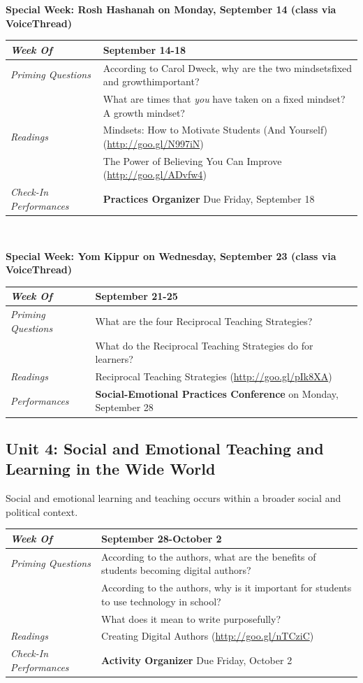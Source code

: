 \documentclass[two-side]{tufte-handout}
\newcommand{\gentopic}[1]{\begin{fullwidth}\begin{center}\faKey \textsf{#1}\end{center}\end{fullwidth}}
\newcommand{\tabpq}{\faQuestionCircle\medspace\textit{Priming Questions}}
\newcommand{\tabread}{\faBook\medspace\textit{Readings}}
\newcommand{\tabperformance}{\faTasks\medspace\textit{Performances}}
\newcommand{\tabdt}{\faCalendar\medspace\textit{Week Of}}
\newcommand{\tabcheckin}{\faCheckSquareO\medspace\textit{Check-In Performances}}
\newcommand{\tabbreak}{\begin{fullwidth}\begin{center}\faAsterisk\faAsterisk\faAsterisk\\\end{center}\end{fullwidth}}
\newcommand{\specialweek}[1]{\begin{fullwidth}\begin{center}\textbf{\faBullhorn\medspace Special Week: #1 \medspace\faBullhorn}\end{center}\end{fullwidth}}
\newenvironment{tabsched}
	{\small
	\begin{tabular}{p{1.5in}p{4.5in}}
	\midrule}
	{\midrule
	\end{tabular}
	\normalsize}
\newcommand{\weekfive}{September 14-18}
\newcommand{\weeksix}{September 21-25}
\newcommand{\weekseven}{September 28-October 2}
\newcommand{\roshhashanah}{Rosh Hashanah on Monday, September 14 (class via VoiceThread)}
\newcommand{\yomkippur}{Yom Kippur on Wednesday, September 23 (class via VoiceThread)}
\begin{document}
\specialweek{\roshhashanah}

\begin{tabsched}
	\tabdt & \weekfive \\
	\midrule
	\tabpq & According to Carol Dweck, why are the two mindsets\textemdash{}fixed and growth\textemdash{}important? \\
	& What are times that \emph{you} have taken on a fixed mindset? A growth mindset? \\
	\midrule
	\tabread & Mindsets: How to Motivate Students (And Yourself) (\url{http://goo.gl/N997iN}) \\
	& The Power of Believing You Can Improve (\url{http://goo.gl/ADvfw4}) \\
	\midrule
	\tabcheckin & \textbf{Practices Organizer} Due Friday, September 18 \\
\end{tabsched}

\tabbreak

\specialweek{\yomkippur}

\begin{tabsched}
	\tabdt & \weeksix \\
	\midrule
	\tabpq & What are the four Reciprocal Teaching Strategies? \\
	& What do the Reciprocal Teaching Strategies do for learners? \\
	\midrule
	\tabread & Reciprocal Teaching Strategies (\url{http://goo.gl/pIk8XA}) \\
	\midrule
	\tabperformance & \textbf{Social-Emotional Practices Conference} on Monday, September 28 \\
\end{tabsched}

\begin{fullwidth}
	\section{Unit 4: Social and Emotional Teaching and Learning in the Wide World}
\end{fullwidth}

\gentopic{Social and emotional learning and teaching occurs within a broader social and political context.}

\begin{tabsched}
	\tabdt & \weekseven \\
	\midrule
	\tabpq & According to the authors, what are the benefits of students becoming digital authors? \\
	& According to the authors, why is it important for students to use technology in school? \\
	& What does it mean to write purposefully? \\
	\midrule
	\tabread & Creating Digital Authors (\url{http://goo.gl/nTCziC}) \\
	\tabcheckin & \textbf{Activity Organizer} Due Friday, October 2 \\
\end{tabsched}
\end{document}
